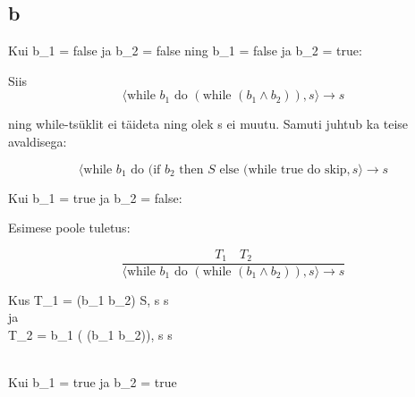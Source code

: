 \subsection{b}

Kui b_1 = false \; ja \; b_2 = false \; ning \; b_1 = false \; ja \; b_2 = true:

Siis 
\[
    \langle
    \text{while } b_1 \text{ do } (\text{while } (b_1 \wedge b_2)), s
    \rangle \rightarrow s
\]

ning while-tsüklit ei täideta ning olek s ei muutu. Samuti juhtub ka teise avaldisega:


\[
    \langle
    \text{while } b_1 \text{ do } (\text{if } b_2 \text{ then } S \text{ else }
    (\text{while true do skip} , s
    \rangle \rightarrow s
\]


Kui b_1 = true \; ja \; b_2 = false:

Esimese poole tuletus:


\[
  \frac{
    T_1
    \quad
    T_2
  }{
    \langle
    \text{while } b_1 \text{ do } (\text{while } (b_1 \wedge b_2)), s
    \rangle \rightarrow s 
  }
\]


Kus T_1 = \langle {} (b_1 \wedge b_2)  S, s \rangle \rightarrow s 
\\[1]
ja 
\\[1]
T_2 = \langle {} b_1  ( (b_1 \wedge b_2)), s \rangle \rightarrow s 
 
\\[2]
Kui b_1 = true \; ja \; b_2 = true

